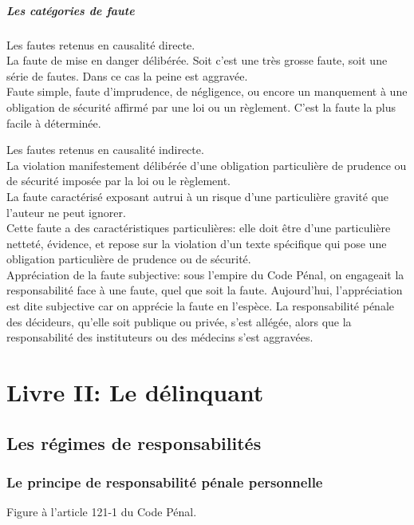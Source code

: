 \documentclass[10pt, a4paper, openany]{book}
\begin{document}
\subsubsection{Les catégories de faute}

Les fautes retenus en causalité directe. \\
La faute de mise en danger délibérée. Soit c'est une très grosse faute, soit une série de fautes. Dans ce cas la peine est aggravée. \\
Faute simple, faute d'imprudence, de négligence, ou encore un manquement à une obligation de sécurité affirmé par une loi ou un règlement. C'est la faute la plus facile à déterminée. 


Les fautes retenus en causalité indirecte. \\
La violation manifestement délibérée d'une obligation particulière de prudence ou de sécurité imposée par la loi ou le règlement. \\
La faute caractérisé exposant autrui à un risque d'une particulière gravité que l'auteur ne peut ignorer. \\
Cette faute a des caractéristiques particulières: elle doit être d'une particulière netteté, évidence, et repose sur la violation d'un texte spécifique qui pose une obligation particulière de prudence ou de sécurité. \\
Appréciation de la faute subjective: sous l'empire du Code Pénal, on engageait la responsabilité face à une faute, quel que soit la faute. Aujourd'hui, l'appréciation est dite subjective car on apprécie la faute en l'espèce. La responsabilité pénale des décideurs, qu'elle soit publique ou privée, s'est allégée, alors que la responsabilité des instituteurs ou des médecins s'est aggravées. 

\part{Livre II: Le délinquant}

\chapter{Les régimes de responsabilités}

\section{Le principe de responsabilité pénale personnelle}

Figure à l'article 121-1 du Code Pénal. 
\end{document}
